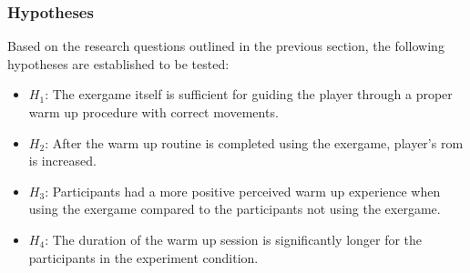 \subsubsection{Hypotheses}
Based on the research questions outlined in the previous section, the following hypotheses are established to be tested: 
\begin{itemize}
\item \begin{math}H_{1}\end{math}: The exergame itself is sufficient for guiding the player through a proper warm up procedure with correct movements. 
\item \begin{math}H_{2}\end{math}: After the warm up routine is completed using the exergame, player's \gls{rom} is increased.
\item \begin{math}H_{3}\end{math}: Participants had a more positive perceived warm up experience when using the exergame compared to the participants not using the exergame.  
\item \begin{math}H_{4}\end{math}: The duration of the warm up session is significantly longer for the participants in the experiment condition.
\end{itemize}
